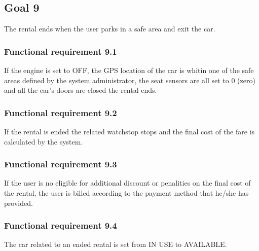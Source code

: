\subsection{Goal 9}
The rental ends when the user parks in a safe area and exit the car.

\setcounter{secnumdepth}{3}
\subsubsection{Functional requirement 9.1}
If the engine is set to OFF, the GPS location of the car is whitin one of the safe areas defined by the system administrator, the seat sensors are all set to 0 (zero) and all the car's doors are closed the rental ends.

\subsubsection{Functional requirement 9.2}
If the rental is ended the related watchstop stops and the final cost of the fare is calculated by the system.

\subsubsection{Functional requirement 9.3}
If the user is no eligible for additional discount or penalities on the final cost of the rental, the user is billed according to the payment method that he/she has provided.

\subsubsection{Functional requirement 9.4}
The car related to an ended rental is set from IN USE to AVAILABLE.

